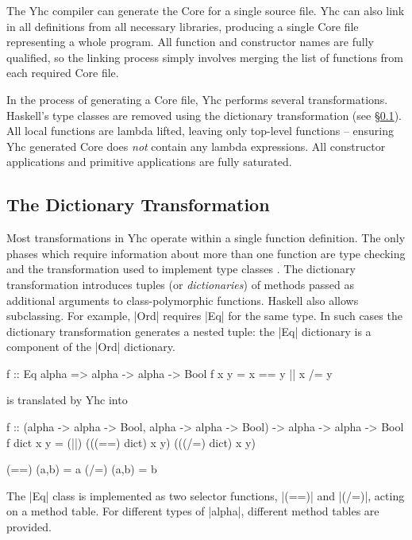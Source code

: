 The Yhc compiler can generate the Core for a single source file. Yhc can also link in all definitions from all necessary libraries, producing a single Core file representing a whole program. All function and constructor names are fully qualified, so the linking process simply involves merging the list of functions from each required Core file.

In the process of generating a Core file, Yhc performs several transformations. Haskell's type classes are removed using the dictionary transformation (see \S\ref{secB:dictionary_transformation}). All local functions are lambda lifted, leaving only top-level functions -- ensuring Yhc generated Core does \textit{not} contain any lambda expressions. All constructor applications and primitive applications are fully saturated.


\subsection{The Dictionary Transformation}
\label{secB:dictionary_transformation}

Most transformations in Yhc operate within a single function definition. The only phases which require information about more than one function are type checking and the transformation used to implement type classes \citep{wadler:type_classes}. The dictionary transformation introduces tuples (or \textit{dictionaries}) of methods passed as additional arguments to class-polymorphic functions. Haskell also allows subclassing. For example, |Ord| requires |Eq| for the same type. In such cases the dictionary transformation generates a nested tuple: the |Eq| dictionary is a component of the |Ord| dictionary.

\begin{example}
\label{exB:dictionary}
\begin{code}
f :: Eq alpha => alpha -> alpha -> Bool
f x y = x == y || x /= y
\end{code}

\noindent is translated by Yhc into

\begin{code}
f :: (alpha -> alpha -> Bool, alpha -> alpha -> Bool) -> alpha -> alpha -> Bool
f dict x y = (||) (((==) dict) x y) (((/=) dict) x y)

(==) (a,b) = a
(/=) (a,b) = b
\end{code}

The |Eq| class is implemented as two selector functions, |(==)| and |(/=)|, acting on a method table. For different types of |alpha|, different method tables are provided.
\end{example}

